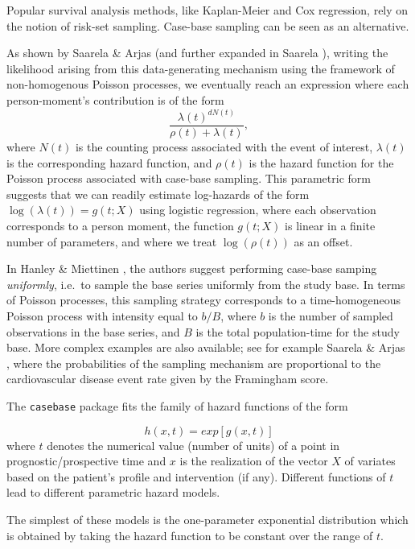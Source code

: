 \documentclass[
]{jss}
\begin{document}
Popular survival analysis methods, like Kaplan-Meier and Cox regression,
rely on the notion of risk-set sampling. Case-base sampling can be seen
as an alternative.

As shown by Saarela \& Arjas \citeyearpar{saarela2015non} (and further
expanded in Saarela \citeyearpar{saarela2016case}), writing the
likelihood arising from this data-generating mechanism using the
framework of non-homogenous Poisson processes, we eventually reach an
expression where each person-moment's contribution is of the form
\[\frac{\lambda(t)^{dN(t)}}{\rho(t) + \lambda(t)},\] where \(N(t)\) is
the counting process associated with the event of interest,
\(\lambda(t)\) is the corresponding hazard function, and \(\rho(t)\) is
the hazard function for the Poisson process associated with case-base
sampling. This parametric form suggests that we can readily estimate
log-hazards of the form \(\log(\lambda(t)) = g(t; X)\) using logistic
regression, where each observation corresponds to a person moment, the
function \(g(t; X)\) is linear in a finite number of parameters, and
where we treat \(\log(\rho(t))\) as an offset.

In Hanley \& Miettinen \citeyearpar{hanley2009fitting}, the authors
suggest performing case-base samping \emph{uniformly}, i.e.~to sample
the base series uniformly from the study base. In terms of Poisson
processes, this sampling strategy corresponds to a time-homogeneous
Poisson process with intensity equal to \(b/B\), where \(b\) is the
number of sampled observations in the base series, and \(B\) is the
total population-time for the study base. More complex examples are also
available; see for example Saarela \& Arjas
\citeyearpar{saarela2015non}, where the probabilities of the sampling
mechanism are proportional to the cardiovascular disease event rate
given by the Framingham score.

The \texttt{casebase} package fits the family of hazard functions of the
form

\[ h(x,t) = exp[g(x,t)] \] where \(t\) denotes the numerical value
(number of units) of a point in prognostic/prospective time and \(x\) is
the realization of the vector \(X\) of variates based on the patient's
profile and intervention (if any). Different functions of \(t\) lead to
different parametric hazard models.

The simplest of these models is the one-parameter exponential
distribution which is obtained by taking the hazard function to be
constant over the range of \(t\).
\end{document}
